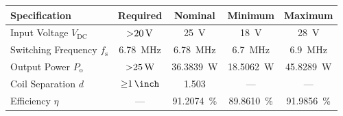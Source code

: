 \documentclass{standalone}
\begin{document}
\centering

\begin{tabular}{lcccc}
	\toprule
	\textbf{Specification}        & \textbf{Required}       & \textbf{Nominal}        & \textbf{Minimum}        & \textbf{Maximum}        \\
	\midrule
	Input Voltage $V_\textrm{DC}$ & $\qty{>20}{\volt}$      & \qty{25}{\volt}         & \qty{18}{\volt}         & \qty{28}{\volt}         \\
	Switching Frequency $f_\textrm{s}$
	                              & \qty{6.78}{\mega\hertz} & \qty{6.78}{\mega\hertz} & \qty{6.7}{\mega\hertz}  & \qty{6.9}{\mega\hertz}  \\
	Output Power $P_\textrm{o}$   & $\qty{>25}{\watt}$      & \qty{36.3839}{\watt}    & \qty{18.5062}{\watt}    & \qty{45.8289}{\watt}    \\
	Coil Separation $d$           & $\qty{\ge1}{\inch}$     & \qty{1.503}{\inch}      & ---                     & ---                     \\
	Efficiency $\eta$             & ---                     & \qty{91.2074}{\percent} & \qty{89.8610}{\percent} & \qty{91.9856}{\percent} \\
	\bottomrule
\end{tabular}
\end{document}
